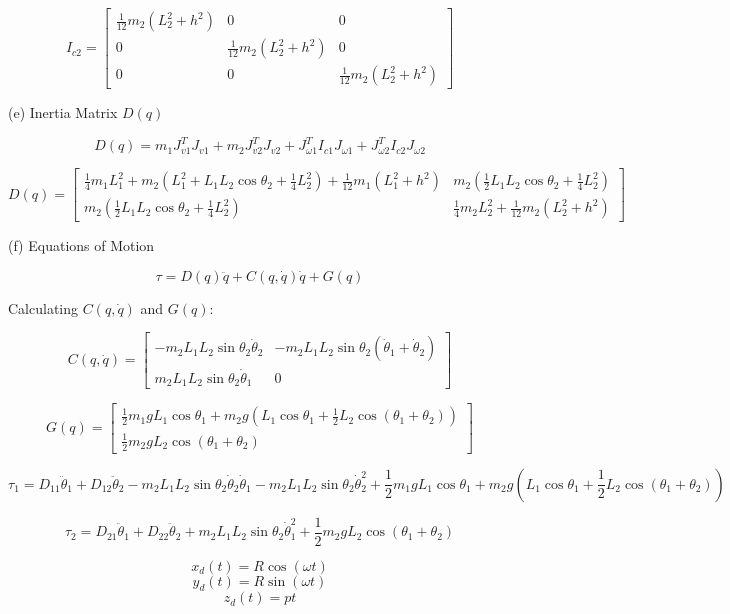 \documentclass{article}
\begin{document}
\[
I_{c2} = \begin{bmatrix} \frac{1}{12}m_2(L_2^2 + h^2) & 0 & 0 \\ 0 & \frac{1}{12}m_2(L_2^2 + h^2) & 0 \\ 0 & 0 & \frac{1}{12}m_2(L_2^2 + h^2) \end{bmatrix}
\]

(e) Inertia Matrix $D(q)$

\[
D(q) = m_1 J_{v1}^T J_{v1} + m_2 J_{v2}^T J_{v2} + J_{\omega 1}^T I_{c1} J_{\omega 1} + J_{\omega 2}^T I_{c2} J_{\omega 2}
\]

\[
D(q) = \begin{bmatrix}
    \frac{1}{4}m_1 L_1^2 + m_2(L_1^2 + L_1 L_2 \cos\theta_2 + \frac{1}{4}L_2^2) + \frac{1}{12}m_1(L_1^2 + h^2) & m_2(\frac{1}{2}L_1 L_2 \cos\theta_2 + \frac{1}{4}L_2^2) \\
    m_2(\frac{1}{2}L_1 L_2 \cos\theta_2 + \frac{1}{4}L_2^2) & \frac{1}{4}m_2 L_2^2 + \frac{1}{12}m_2(L_2^2 + h^2)
\end{bmatrix}
\]

(f) Equations of Motion

\[
\tau = D(q) \ddot{q} + C(q, \dot{q}) \dot{q} + G(q)
\]

Calculating $C(q, \dot{q})$ and $G(q)$:

\[
C(q, \dot{q}) = \begin{bmatrix}
    -m_2 L_1 L_2 \sin\theta_2 \dot{\theta}_2 & -m_2 L_1 L_2 \sin\theta_2 (\dot{\theta}_1 + \dot{\theta}_2) \\
    m_2 L_1 L_2 \sin\theta_2 \dot{\theta}_1 & 0
\end{bmatrix}
\]

\[
G(q) = \begin{bmatrix}
    \frac{1}{2} m_1 g L_1 \cos\theta_1 + m_2 g (L_1 \cos\theta_1 + \frac{1}{2} L_2 \cos(\theta_1 + \theta_2)) \\
    \frac{1}{2} m_2 g L_2 \cos(\theta_1 + \theta_2)
\end{bmatrix}
\]


\[
\tau_1 = D_{11} \ddot{\theta}_1 + D_{12} \ddot{\theta}_2 - m_2 L_1 L_2 \sin\theta_2 \dot{\theta}_2 \dot{\theta}_1 - m_2 L_1 L_2 \sin\theta_2 \dot{\theta}_2^2 + \frac{1}{2} m_1 g L_1 \cos\theta_1 + m_2 g (L_1 \cos\theta_1 + \frac{1}{2} L_2 \cos(\theta_1 + \theta_2))
\]

\[
\tau_2 = D_{21} \ddot{\theta}_1 + D_{22} \ddot{\theta}_2 + m_2 L_1 L_2 \sin\theta_2 \dot{\theta}_1^2 + \frac{1}{2} m_2 g L_2 \cos(\theta_1 + \theta_2)
\]


\[
x_d(t) = R \cos(\omega t)
\]
\[
y_d(t) = R \sin(\omega t)
\]
\[
z_d(t) = pt
\]
\end{document}
